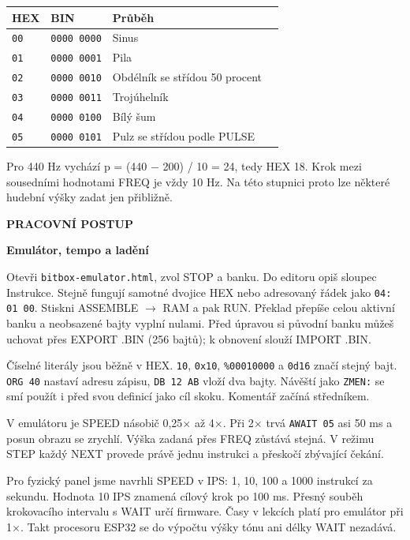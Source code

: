 \documentclass[11pt,a4paper]{article}
\newcommand{\tagline}[1]{{\sffamily\bfseries\color{accent}\small #1}\par}
\newcommand{\titleline}[1]{{\sffamily\bfseries\fontsize{25}{29}\selectfont #1\par}\vspace{2mm}}
\newcommand{\sub}[1]{\par\vspace{2mm}{\sffamily\bfseries\large #1\par}\nobreak}
\begin{document}
\sub{Argument WAVE}
{\small\begin{tabularx}{\linewidth}{@{}lllX@{}}\toprule
\textbf{HEX} & \textbf{BIN} & \textbf{Průběh} & \textbf{}\\\midrule
\texttt{00} & \texttt{0000 0000} & Sinus & \\
\texttt{01} & \texttt{0000 0001} & Pila & \\
\texttt{02} & \texttt{0000 0010} & Obdélník se střídou 50 procent & \\
\texttt{03} & \texttt{0000 0011} & Trojúhelník & \\
\texttt{04} & \texttt{0000 0100} & Bílý šum & \\
\texttt{05} & \texttt{0000 0101} & Pulz se střídou podle PULSE & \\
\bottomrule\end{tabularx}}\par
Pro 440 Hz vychází p = (440 \ensuremath{-} 200) / 10 = 24, tedy HEX 18. Krok mezi sousedními hodnotami FREQ je vždy 10 Hz. Na této stupnici proto lze některé hudební výšky zadat jen přibližně.

\clearpage
\tagline{PRACOVNÍ POSTUP}
\titleline{Emulátor, tempo a ladění}
\sub{Jak dostat výpis do emulátoru}
Otevři \texttt{bitbox-emulator.html}, zvol STOP a banku. Do editoru opiš sloupec Instrukce. Stejně fungují samotné dvojice HEX nebo adresovaný řádek jako \texttt{04: 01 00}. Stiskni ASSEMBLE \ensuremath{\rightarrow} RAM a pak RUN. Překlad přepíše celou aktivní banku a neobsazené bajty vyplní nulami. Před úpravou si původní banku můžeš uchovat přes EXPORT .BIN (256 bajtů); k obnovení slouží IMPORT .BIN.

Číselné literály jsou běžně v HEX. \texttt{10}, \texttt{0x10}, \texttt{\%00010000} a \texttt{0d16} značí stejný bajt. \texttt{ORG 40} nastaví adresu zápisu, \texttt{DB 12 AB} vloží dva bajty. Návěští jako \texttt{ZMEN:} se smí použít i před svou definicí jako cíl skoku. Komentář začíná středníkem.

\sub{Tři různé rychlosti}
V emulátoru je SPEED násobič 0,25\ensuremath{\times} až 4\ensuremath{\times}. Při 2\ensuremath{\times} trvá \texttt{AWAIT 05} asi 50 ms a posun obrazu se zrychlí. Výška zadaná přes FREQ zůstává stejná. V režimu STEP každý NEXT provede právě jednu instrukci a přeskočí zbývající čekání.

Pro fyzický panel jsme navrhli SPEED v IPS: 1, 10, 100 a 1000 instrukcí za sekundu. Hodnota 10 IPS znamená cílový krok po 100 ms. Přesný souběh krokovacího intervalu s WAIT určí firmware. Časy v lekcích platí pro emulátor při 1\ensuremath{\times}. Takt procesoru ESP32 se do výpočtu výšky tónu ani délky WAIT nezadává.
\end{document}

